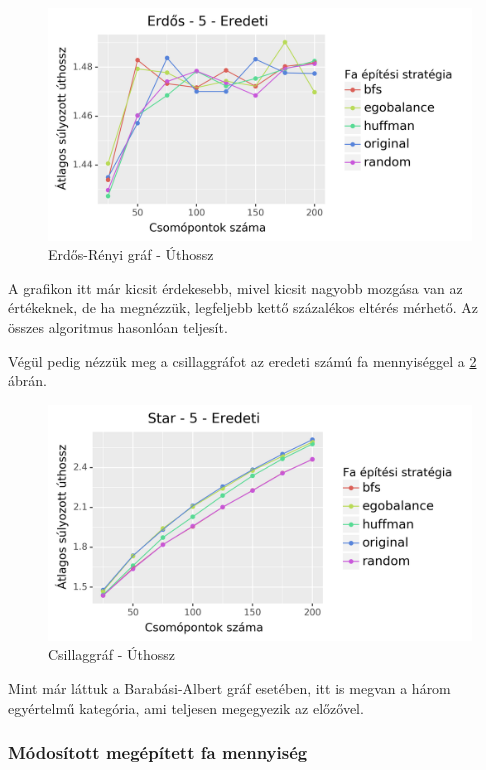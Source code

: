 \documentclass[12pt]{report}
\begin{document}
\begin{figure}[H]
	\begin{center}
		\includegraphics[width=0.9\linewidth]{pictures/erdos_len_e.png}
		\caption{Erdős-Rényi gráf - Úthossz}
		\label{erdos-len}
	\end{center}
\end{figure}

A grafikon itt már kicsit érdekesebb, mivel kicsit nagyobb mozgása van az értékeknek, de ha megnézzük, legfeljebb kettő százalékos eltérés mérhető.
Az összes algoritmus hasonlóan teljesít.   

Végül pedig nézzük meg a csillaggráfot az eredeti számú fa mennyiséggel a \ref{star-len} ábrán.

\begin{figure}[H]
	\begin{center}
		\includegraphics[width=0.9\linewidth]{pictures/star_len_e.png}
		\caption{Csillaggráf - Úthossz}
		\label{star-len}
	\end{center}
\end{figure}

Mint már láttuk a Barabási-Albert gráf esetében, itt is megvan a három egyértelmű kategória, ami teljesen megegyezik az előzővel.

\subsubsection{Módosított megépített fa mennyiség}
\end{document}
